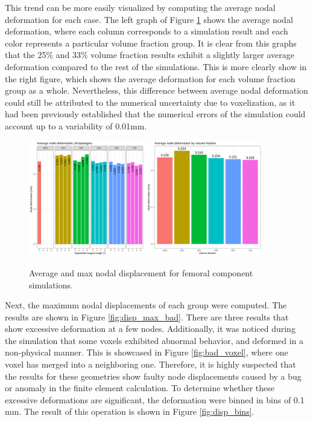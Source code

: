 \documentclass[../main.tex]{subfiles}
\begin{document}
This trend can be more easily visualized by computing the average nodal deformation for each case. The left graph of Figure \ref{fig:disp_averages} shows the average nodal deformation, where each column corresponds to a simulation result and each color represents a particular volume fraction group. It is clear from this graphs that the 25\% and 33\% volume fraction results exhibit a slightly larger average deformation compared to the rest of the simulations. This is more clearly show in the right figure, which shows the average deformation for each volume fraction group as a whole. Nevertheless, this difference between average nodal deformation could still be attributed to the numerical uncertainty due to voxelization, as it had been previously established that the numerical errors of the simulation could account up to a variability of 0.01mm.

\begin{figure}[h!]
  \includegraphics[width=0.45\textwidth]{images/results/plots/femoral/displacement/femoral_average.png}
  \hfill 
  \includegraphics[width=0.45\textwidth]{images/results/plots/femoral/displacement/femoral_average_group.png}
  \caption{Average and max nodal displacement for femoral component simulations.}
  \label{fig:disp_averages}
\end{figure}

Next, the maximum nodal displacements of each group were computed. The results are shown in Figure \ref{fig:disp_max_bad}. There are three results that show excessive deformation at a few nodes. Additionally, it was noticed during the simulation that some voxels exhibited abnormal behavior, and deformed in a non-physical manner. This is showcased in Figure \ref{fig:bad_voxel}, where one voxel has merged into a neighboring one. Therefore, it is highly suspected that the results for these geometries show faulty node displacements caused by a bug or anomaly in the finite element calculation. To determine whether these excessive deformations are significant, the deformation were binned in bins of 0.1 mm. The result of this operation is shown in  Figure \ref{fig:disp_bins}.
\end{document}
